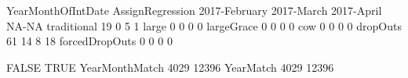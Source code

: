 \begin{Schunk}
\begin{Soutput}
                YearMonthOfIntDate
AssignRegression 2017-February 2017-March 2017-April NA-NA
  traditional               19          0          5     1
  large                      0          0          0     0
  largeGrace                 0          0          0     0
  cow                        0          0          0     0
  dropOuts                  61         14          8    18
  forcedDropOuts             0          0          0     0
\end{Soutput}
\begin{Soutput}
               FALSE  TRUE
YearMonthMatch  4029 12396
YearMatch       4029 12396
\end{Soutput}
\end{Schunk}





